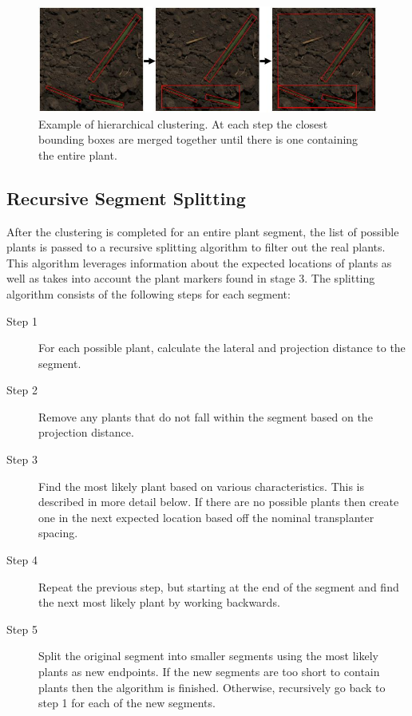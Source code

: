 \begin{figure}
	\centering
    \includegraphics[width=5in]{figures/clustering.jpg}
    \caption[Hierarchical clustering]{Example of hierarchical clustering. At each step the closest bounding boxes are merged together until there is one containing the entire plant.}
    \label{figure:clustering}
\end{figure}

\subsection{Recursive Segment Splitting}

After the clustering is completed for an entire plant segment, the list of possible plants is passed to a recursive splitting algorithm to filter out the real plants.  This algorithm leverages information about the expected locations of plants as well as takes into account the plant markers found in stage 3.  The splitting algorithm consists of the following steps for each segment:

\begin{description}
\item[Step 1] For each possible plant, calculate the lateral and projection distance to the segment.  
\item[Step 2] Remove any plants that do not fall within the segment based on the projection distance.
\item[Step 3] Find the most likely plant based on various characteristics.  This is described in more detail below.  If there are no possible plants then create one in the next expected location based off the nominal transplanter spacing.  
\item[Step 4] Repeat the previous step, but starting at the end of the segment and find the next most likely plant by working backwards.
\item[Step 5] Split the original segment into smaller segments using the most likely plants as new endpoints.  If the new segments are too short to contain plants then the algorithm is finished.  Otherwise, recursively go back to step 1 for each of the new segments.
\end{description}

